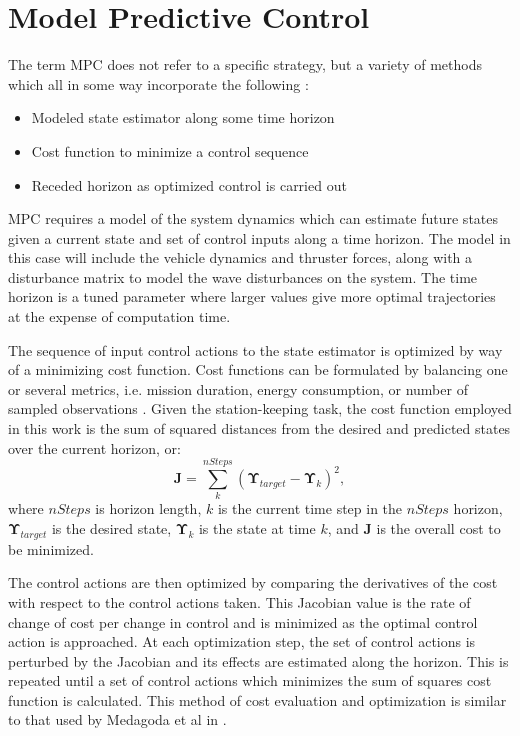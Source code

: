 \documentclass[letterpaper, 10pt, conference]{IEEEtran}
\renewcommand{\vec}[1]{\mathbf{#1}}
\begin{document}
\section{Model Predictive Control} 
\label{sec:mpc}

The term MPC does not refer to a specific strategy, but a variety of methods which all in some way incorporate the following \cite{camacho}:
\begin{itemize}
  \itemsep0.25em
  \item Modeled state estimator along some time horizon
  \item Cost function to minimize a control sequence 
  \item Receded horizon as optimized control is carried out 
\end{itemize}

MPC requires a model of the system dynamics which can estimate future states given a current state and set of control inputs along a time horizon. The model in this case will include the vehicle dynamics and thruster forces, along with a disturbance matrix to model the wave disturbances on the system. The time horizon is a tuned parameter where larger values give more optimal trajectories at the expense of computation time. 

The sequence of input control actions to the state estimator is optimized by way of a minimizing cost function. Cost functions can be formulated by balancing one or several metrics, i.e. mission duration, energy consumption, or number of sampled observations \cite{lavalle, binney}. Given the station-keeping task, the cost function employed in this work is the sum of squared distances from the desired and predicted states over the current horizon, or:
\begin{equation}
\vec{J} = \sum_{k}^{nSteps}(\vec{\Upsilon}_{target} - \vec{\Upsilon}_k)^2,
\label{eqn1}
\end{equation}
where $nSteps$ is horizon length, $k$ is the current time step in the $nSteps$ horizon, $\vec{\Upsilon}_{target}$ is the desired state, $\vec{\Upsilon}_k$ is the state at time $k$, and $\vec{J}$ is the overall cost to be minimized. 

The control actions are then optimized by comparing the derivatives of the cost with respect to the control actions taken. This Jacobian value is the rate of change of cost per change in control and is minimized as the optimal control action is approached. At each optimization step, the set of control actions is perturbed by the Jacobian and its effects are estimated along the horizon. This is repeated until a set of control actions which minimizes the sum of squares cost function is calculated. This method of cost evaluation and optimization is similar to that used by Medagoda et al in \cite{medagodaMPC}.
\end{document}
